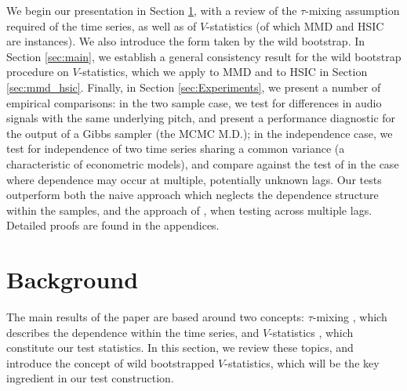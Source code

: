 

We begin our presentation in Section \ref{sec:background}, with a review of the $\tau$-mixing assumption required of the time series, as well as of   $V$-statistics (of which MMD and HSIC are instances). We also introduce the form taken by the wild bootstrap. In Section \ref{sec:main}, we establish a general consistency result for the wild bootstrap procedure on $V$-statistics, which we apply to MMD and to HSIC in Section \ref{sec:mmd_hsic}. Finally, in Section \ref{sec:Experiments}, we present a number of empirical comparisons: in the two sample case, we test for differences in audio signals with the same underlying pitch, and present a performance diagnostic for the output of a Gibbs sampler (the MCMC M.D.); in the independence case, we test for independence of two time series sharing a common variance (a characteristic of econometric models), and compare against the test of \cite{besserve_statistical_2013} in the case where dependence may occur at multiple, potentially unknown lags. Our tests outperform both the naive approach which neglects the dependence structure within the samples, and the approach of \cite{besserve_statistical_2013}, when testing across multiple lags. Detailed proofs are found in the appendices.

\section{Background}\label{sec:background}
The main results of the paper are based around two concepts: $\tau$-mixing \cite{dedecker2007weak}, which describes the dependence within the time series, and  $V$-statistics \cite{serfling80}, which constitute our test statistics. In this section, we review these topics, and introduce the concept of wild bootstrapped $V$-statistics, which will be the key ingredient in our test construction.
